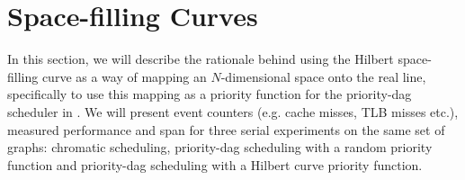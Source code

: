 \section{Space-filling Curves}
\label{sec:hilbert}

In this section, we will describe the rationale behind using the
Hilbert space-filling curve as a way of mapping an $N$-dimensional
space onto the real line, specifically to use this mapping as a
priority function for the priority-dag scheduler in .
We will present event counters (e.g. cache misses, TLB misses etc.), 
measured performance and span for three serial experiments on the same
set of graphs: chromatic scheduling, priority-dag scheduling with
a random priority function and priority-dag scheduling with a
Hilbert curve priority function.  